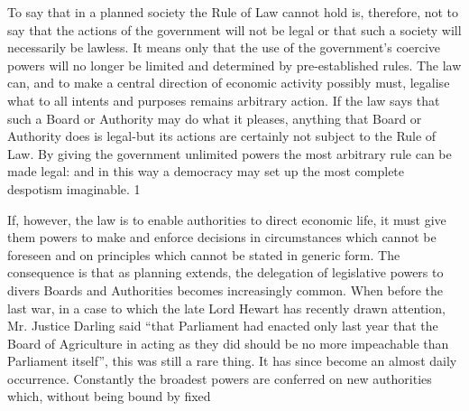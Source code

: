 \documentclass[11pt,openany]{book}
\begin{document}
To say that in a planned society the Rule of Law cannot hold is, therefore, not to say that the actions of the government will not be legal or that such a society will necessarily be lawless. It means only that the use of the government's coercive powers will no longer be limited and determined by pre-established rules. The law can, and to make a central direction of economic activity possibly must, legalise what to all intents and purposes remains arbitrary action. If the law says that such a Board or Authority may do what it pleases, anything that Board or Authority does is legal-but its actions are certainly not subject to the Rule of Law. By giving the government unlimited powers the most arbitrary rule can be made legal: and in this way a democracy may set up the most complete despotism imaginable. 1

If, however, the law is to enable authorities to direct economic life, it must give them powers to make and enforce decisions in circumstances which cannot be foreseen and on principles which cannot be stated in generic form. The consequence is that as planning extends, the delegation of legislative powers to divers Boards and Authorities becomes increasingly common. When before the last war, in a case to which the late Lord Hewart has recently drawn attention, Mr. Justice Darling said ``that Parliament had enacted only last year that the Board of Agriculture in acting as they did should be no more impeachable than Parliament itself'', this was still a rare thing. It has since become an almost daily occurrence. Constantly the broadest powers are conferred on new authorities which, without being bound by fixed
\end{document}
